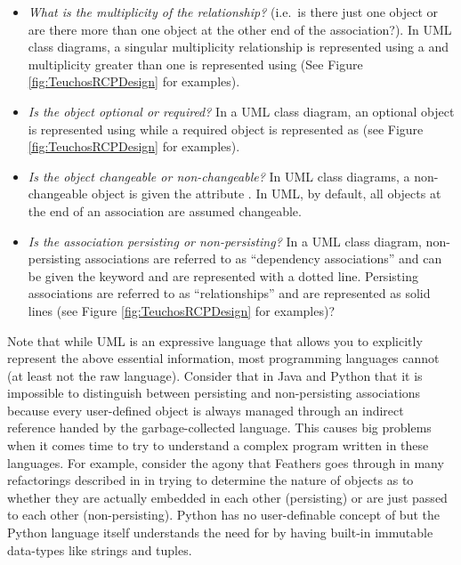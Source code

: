 \documentclass[pdf,ps2pdf,11pt]{SANDreport}
\begin{document}
\begin{itemize}

{}\item\textit{What is the multiplicity of the relationship?}  (i.e.\
is there just one object or are there more than one object at the
other end of the association?).  In UML class diagrams, a singular
multiplicity relationship is represented using a {}\ttt{1} and
multiplicity greater than one is represented using {}
(See Figure {}\ref{fig:TeuchosRCPDesign} for examples).

{}\item\textit{Is the object optional or required?}  In a UML class
diagram, an optional object is represented using {}\ttt{0..1} while
a required object is represented as {}\ttt{1} (see Figure
{}\ref{fig:TeuchosRCPDesign} for examples).

{}\item\textit{Is the object changeable or non-changeable?}  In UML
class diagrams, a non-changeable object is given the attribute
{}.  In UML, by default, all objects at the end
of an association are assumed changeable.

{}\item\textit{Is the association persisting or non-persisting?}  In a
UML class diagram, non-persisting associations are referred to as
``dependency associations'' and can be given the keyword
{} and are represented with a dotted line.
Persisting associations are referred to as ``relationships'' and are
represented as solid lines (see Figure {}\ref{fig:TeuchosRCPDesign}
for examples)?

\end{itemize}

Note that while UML is an expressive language that allows you to
explicitly represent the above essential information, most programming
languages cannot (at least not the raw language).  Consider that in
Java and Python that it is impossible to distinguish between
persisting and non-persisting associations because every user-defined
object is always managed through an indirect reference handed by the
garbage-collected language.  This causes big problems when it comes
time to try to understand a complex program written in these
languages.  For example, consider the agony that Feathers goes through
in many refactorings described in
{}\cite{WorkingEffectivelyWithLegacyCode05} in trying to determine the
nature of objects as to whether they are actually embedded in each
other (persisting) or are just passed to each other (non-persisting).
Python has no user-definable concept of {} but the
Python language itself understands the need for {}\ttt{const} by
having built-in immutable data-types like strings and tuples.
\end{document}
